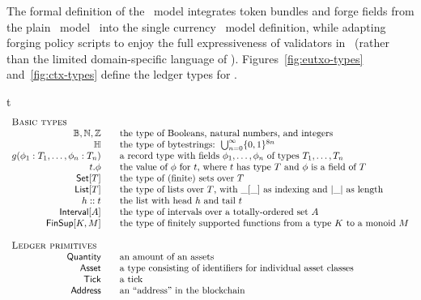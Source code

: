 The formal definition of the \EUTXOma\ model integrates token bundles and forge fields from the plain \UTXOma\ model~\cite{plain-multicurrency} into the single currency \EUTXO\ model definition, while adapting forging policy scripts to enjoy the full expressiveness of validators in \EUTXO\ (rather than the limited domain-specific language of \UTXOma). Figures~\ref{fig:eutxo-types} and~\ref{fig:ctx-types} define the ledger types for \EUTXOma.
%
%
\begin{ruledfigure}{t}
  \begin{displaymath}
    \begin{array}{rll}
      \multicolumn{3}{l}{\textsc{Basic types}}\\
     \B, \N, \Z && \mbox{the type of Booleans, natural numbers, and integers}\\
      \H{} && \mbox{the type of bytestrings: } \bigcup_{n=0}^{\infty}\{0,1\}^{8n}\\g
      (\phi_1 : T_1, \ldots, \phi_n : T_n) && \mbox{a record type with fields $\phi_1, \ldots, \phi_n$ of types $T_1, \ldots, T_n$}\\
      t.\phi && \mbox{the value of $\phi$ for $t$, where $t$ has type $T$ and $\phi$ is a field of $T$}\\
      \Set{T} && \mbox{the type of (finite) sets over $T$}\\
      \List{T} && \mbox{the type of lists over $T$, with $\_[\_]$ as indexing and $|\_|$ as length}\\
      h::t && \mbox{the list with head $h$ and tail $t$}\\
      \Interval{A} && \mbox{the type of intervals over a totally-ordered set $A$}\\
      \FinSup{K}{M} && \mbox{the type of finitely supported functions from a type $K$ to a monoid $M$}\\
      \\
      \multicolumn{3}{l}{\textsc{Ledger primitives}}\\
      \Quantity && \mbox{an amount of an assets}\\
      \Asset && \mbox{a type consisting of identifiers for individual asset classes}\\
      \Tick && \mbox{a tick}\\
      \Address && \mbox{an ``address'' in the blockchain}\\

\end{array}
\end{displaymath}
\end{ruledfigure}
